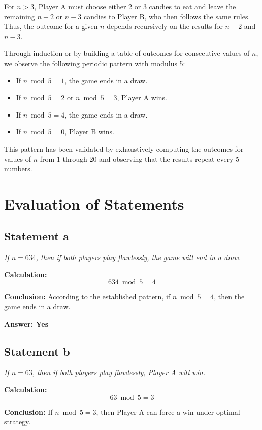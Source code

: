 \documentclass[12pt]{article}
\begin{document}
For $n > 3$, Player A must choose either 2 or 3 candies to eat and leave the remaining $n-2$ or $n-3$ candies to Player B, who then follows the same rules. Thus, the outcome for a given $n$ depends recursively on the results for $n-2$ and $n-3$.

Through induction or by building a table of outcomes for consecutive values of $n$, we observe the following periodic pattern with modulus 5:

\begin{itemize}
    \item If $n \bmod 5 = 1$, the game ends in a draw.
    \item If $n \bmod 5 = 2$ or $n \bmod 5 = 3$, Player A wins.
    \item If $n \bmod 5 = 4$, the game ends in a draw.
    \item If $n \bmod 5 = 0$, Player B wins.
\end{itemize}

This pattern has been validated by exhaustively computing the outcomes for values of $n$ from 1 through 20 and observing that the results repeat every 5 numbers.

\section{Evaluation of Statements}

\subsection{Statement a}

\textit{If $n = 634$, then if both players play flawlessly, the game will end in a draw.}

\textbf{Calculation:}
\[
634 \bmod 5 = 4
\]

\textbf{Conclusion:} According to the established pattern, if $n \bmod 5 = 4$, then the game ends in a draw.

\textbf{Answer: Yes}

\subsection{Statement b}

\textit{If $n = 63$, then if both players play flawlessly, Player A will win.}

\textbf{Calculation:}
\[
63 \bmod 5 = 3
\]

\textbf{Conclusion:} If $n \bmod 5 = 3$, then Player A can force a win under optimal strategy.
\end{document}

